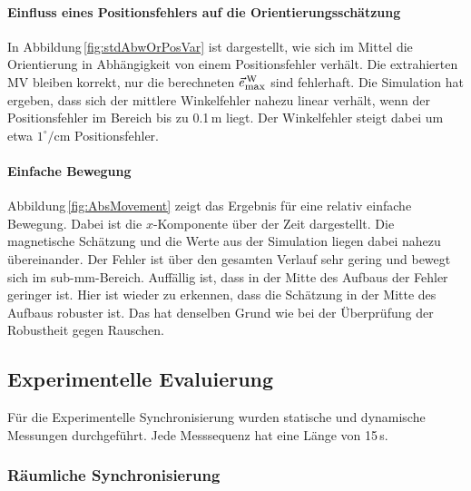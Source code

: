 \paragraph{Einfluss eines Positionsfehlers auf die Orientierungsschätzung}
In Abbildung\,\ref{fig:stdAbwOrPosVar} ist dargestellt, wie sich im Mittel die Orientierung in Abhängigkeit von einem Positionsfehler verhält. Die extrahierten MV bleiben korrekt, nur die berechneten $\vec{e}^{\,\text{W}}_{\textrm{\footnotesize{max}}}$ sind fehlerhaft. Die Simulation hat ergeben, dass sich der mittlere Winkelfehler nahezu linear verhält, wenn der Positionsfehler im Bereich bis zu 0.1\,m liegt.  Der Winkelfehler steigt dabei um etwa $1^\circ/\text{cm}$ Positionsfehler.  

\paragraph{Einfache Bewegung}
Abbildung\,\ref{fig:AbsMovement} zeigt das Ergebnis für eine relativ einfache Bewegung. Dabei ist die $x$-Komponente über der Zeit dargestellt. Die magnetische Schätzung und die Werte aus der Simulation liegen dabei nahezu übereinander. Der Fehler ist über den gesamten Verlauf sehr gering und bewegt sich im sub-mm-Bereich. Auffällig ist, dass in der Mitte des Aufbaus der Fehler geringer ist. Hier ist wieder zu erkennen, dass die Schätzung in der Mitte des Aufbaus robuster ist. Das hat denselben Grund wie bei der Überprüfung der Robustheit gegen Rauschen.

\subsection{Experimentelle Evaluierung}
Für die Experimentelle Synchronisierung wurden statische und dynamische Messungen durchgeführt. Jede Messsequenz hat eine Länge von 15\,s.
\subsubsection{Räumliche Synchronisierung}

